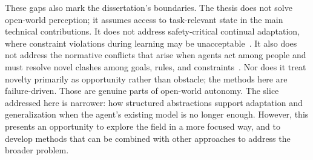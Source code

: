 These gaps also mark the dissertation's boundaries.
The thesis does not solve open-world perception; it assumes access to task-relevant state in the main technical contributions.
It does not address safety-critical continual adaptation, where constraint violations during learning may be unacceptable~\citep{coursey2026safe}.
It also does not address the normative conflicts that arise when agents act among people and must resolve novel clashes among goals, rules, and constraints~\citep{jones2026oamncc}.
Nor does it treat novelty primarily as opportunity rather than obstacle; the methods here are failure-driven.
Those are genuine parts of open-world autonomy.
The slice addressed here is narrower: how structured abstractions support adaptation and generalization when the agent's existing model is no longer enough. However, this presents an opportunity to explore the field in a more focused way, and to develop methods that can be combined with other approaches to address the broader problem.
